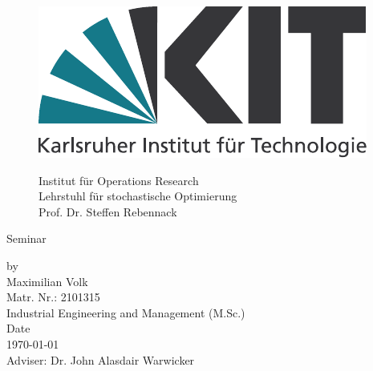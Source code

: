 \documentclass[a4paper,12pt]{article}
\begin{document}
\begin{titlepage}

\begin{figure}
\begin{minipage}{0.2\textwidth}
\includegraphics[scale=.6]{kit_logo_de_4c_positiv-rgb.pdf}
\end{minipage}
\hfill
\begin{minipage}{0.6\textwidth}
\begin{flushright}
Institut f\"ur Operations Research \\
Lehrstuhl f\"ur stochastische Optimierung \\
Prof. Dr. Steffen Rebennack \\
\medskip
\end{flushright}
\end{minipage}
\bigskip
\end{figure}

\vspace*{35pt}

\begin{center}
\Large{Seminar}    

\vspace*{35pt}

\fboxsep 40pt
\fboxrule 6pt

\vspace*{40pt}

\normalsize

by \\[4ex]

Maximilian Volk\\
Matr. Nr.: 2101315\\
Industrial Engineering and Management (M.Sc.)\\[4ex]

Date\\
\today
\\[4ex]

Adviser:
Dr. John Alasdair Warwicker

\end{center}

\end{titlepage}
\thispagestyle{empty}\cleardoublepage
\end{document}
